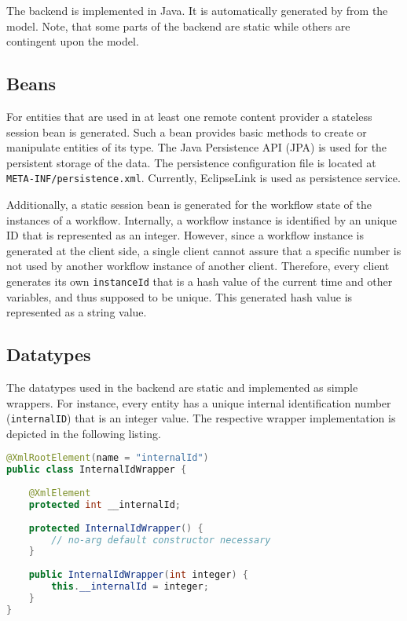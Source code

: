 
\lstset{language=Simple}

The \MD backend is implemented in Java. It is automatically generated by from the \MD model. Note, that some parts of the backend are static while others are contingent upon the model.

\subsection{Beans}
\label{subsec:beans}
For entities that are used in at least one remote content provider a stateless session bean is generated. Such a bean provides basic methods to create or manipulate entities of its type. The Java Persistence API (JPA) is used for the persistent storage of the data. The persistence configuration file is located at \lstinline|META-INF/persistence.xml|. Currently, EclipseLink is used as persistence service.

Additionally, a static session bean is generated for the workflow state of the instances of a workflow. Internally, a workflow instance is identified by an unique ID that is represented as an integer. However, since a workflow instance is generated at the client side, a single client cannot assure that a specific number is not used by another workflow instance of another client. Therefore, every client generates its own \lstinline|instanceId| that is a hash value of the current time and other variables, and thus supposed to be unique. This generated hash value is represented as a string value.

\subsection{Datatypes}
The datatypes used in the backend are static and implemented as simple wrappers. For instance, every entity has a unique internal identification number (\lstinline|internalID|) that is an integer value. The respective wrapper implementation is depicted in the following listing. 

\begin{lstlisting}[language=Java, label=lst:intIdWrapper, caption=An integer wrapper for the internal identification number]
@XmlRootElement(name = "internalId")
public class InternalIdWrapper {
	
	@XmlElement
	protected int __internalId;
	
	protected InternalIdWrapper() {
		// no-arg default constructor necessary
	}
	
	public InternalIdWrapper(int integer) {
		this.__internalId = integer;
	}
}
\end{lstlisting}

